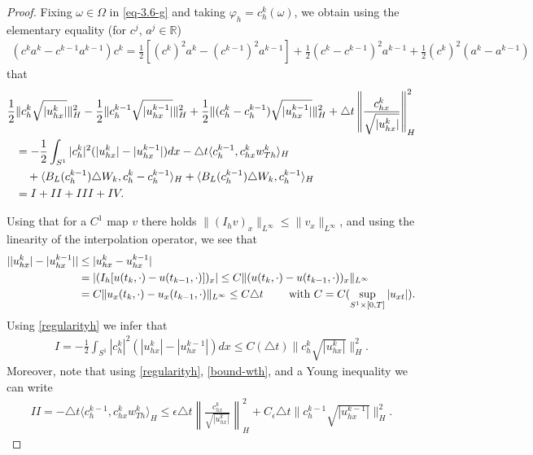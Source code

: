 \documentclass[a4paper,10pt]{article}
\newcommand{\R}{\mathbb{R}}
\def\Bapprox{B_L}
\numberwithin{equation}{section}
\begin{document}
\begin{proof}
Fixing $\omega \in \Omega$ in \eqref{eq-3.6-g} and taking $\varphi_{h}= c_{h}^{k}(\omega)$, we obtain using
the elementary equality (for $c^{j}$, $a^{j} \in \R$)
\begin{align}\label{algebra}
(c^{k}a^{k} - c^{k-1}a^{k-1})c^{k}= \frac{1}{2} [(c^{k})^{2}a^{k} -(c^{k-1})^{2}a^{k-1}] 
+ \frac{1}{2} (c^{k}-c^{k-1})^{2}a^{k-1} + \frac{1}{2} (c^{k})^{2} (a^{k}-a^{k-1})
\end{align}
that
\begin{align}\label{InMezzo}
\frac{1}{2 } &\| c^{k}_{h}\sqrt{|u^{k}_{hx}|} \|^{2}_{H}- \frac{1}{2 } \| c_{h}^{k-1}\sqrt{|u^{k-1}_{hx}|}\|^{2}_{H} +\frac{1}{2 }\|(c_{h}^{k} -c_{h}^{k-1})\sqrt{|u^{k-1}_{hx}|}\|^{2}_{H}
+\triangle t \left \| \frac{c_{hx}^{k}}{\sqrt{|u^{k}_{hx}| } } \right \|^{2}_{H} \notag \\
&= -\frac{1}{2} \int_{S^{1}}|c_{h}^{k}|^{2} (|u^{k}_{hx}|-|u^{k-1}_{hx}|) dx
-\triangle t \langle c^{k-1}_{h}, c^{k}_{hx} w_{Th}^{k} \rangle_{H} \notag \\
& \quad 
+ \langle \Bapprox(c^{k-1}_{h})\triangle W_{k},c^{k}_{h} -c^{k-1}_{h} \rangle_{H}
+ \langle \Bapprox(c^{k-1}_{h})\triangle W_{k}, c^{k-1}_{h}\rangle_{H} \notag \\
& =I+II+III+IV.
\end{align}

Using that for a $C^{1}$ map $v$ there holds $\|(I_{h}v )_{x}\|_{L^{\infty}} \leq \| v_{x}\|_{L^{\infty}}$, and using the linearity of the interpolation operator, we see that
\begin{align}\label{err-uhx}
||u^{k}_{hx}|-|u^{k-1}_{hx}|| &\leq |u^{k}_{hx} - u^{k-1}_{hx} | \notag \\
&=|(I_{h}[ u(t_{k}, \cdot) - u(t_{k-1}, \cdot)] )_{x}| \leq C\| ( u(t_{k}, \cdot) - u(t_{k-1}, \cdot))_{x} \|_{L^{\infty}} \notag \\
&=C\| u_{x}(t_{k}, \cdot) - u_{x}(t_{k-1}, \cdot) \|_{L^{\infty}} \leq C \triangle t \qquad \text{ with } C =C(\sup_{S^{1} \times [0,T]} |u_{xt}|).
\end{align}
Using \eqref{regularityh} we infer that
\begin{align*}
I =-\frac{1}{2} \int_{S^{1}}|c_{h}^{k}|^{2} (|u^{k}_{hx}|-|u^{k-1}_{hx}|) dx
 \leq C ( \triangle t)\| c^{k}_{h}\sqrt{|u^{k}_{hx}|} \|^{2}_{H}.
\end{align*}
Moreover, note that using \eqref{regularityh}, \eqref{bound-wth}, and a Young inequality we can write
\begin{align*}
II=-\triangle t \langle c^{k-1}_{h}, c^{k}_{hx} w_{Th}^{k} \rangle_{H} \leq
\epsilon \triangle t \left \| \frac{c_{hx}^{k}}{\sqrt{|u^{k}_{hx}| } } \right \|^{2}_{H}
+ C_{\epsilon} \triangle t \| c_{h}^{k-1}\sqrt{|u^{k-1}_{hx}|}\|^{2}_{H}.
\end{align*}


\end{proof}
\end{document}
